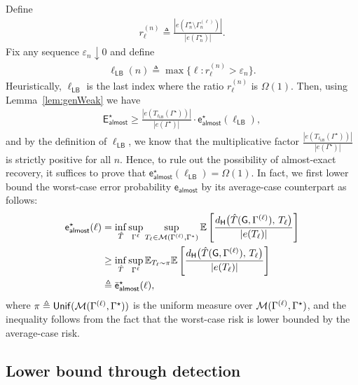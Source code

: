 \documentclass[12pt]{article}
\newcommand{\bE}{\mathbb{E}}
\newcommand{\calM}{{\cal M}}
\newcommand{\s}[1]{\mathsf{#1}}
\begin{document}
Define
\begin{align}
r_\ell^{(n)}\triangleq\frac{|e(\Gamma_n^\star\setminus \Gamma_n^{(\ell)})|}{|e(\Gamma^\star_n)|}.
\end{align}
Fix any sequence $\varepsilon_n\downarrow 0$ and define
\begin{align}
\ell_{\s{LB}}(n)\triangleq\max\{\ell: r_\ell^{(n)}>\varepsilon_n\}.
\end{align}
Heuristically, $\ell_{\s{LB}}$ is the last index where the ratio $r_\ell^{(n)}$ is $\Omega(1)$. Then, using Lemma~\ref{lem:genWeak} we have
\begin{align}
    \s{E}^\star_{\s{almost}}\geq \frac{|e(T_{\ell_{\s{LB}}}(\Gamma^\star))|}{|e(\Gamma^\star)|}\cdot\s{e}_{\s{almost}}^\star(\ell_{\s{LB}}),
\end{align}
and by the definition of $\ell_{\s{LB}}$, we know that the multiplicative factor $\frac{|e(T_{\ell_{\s{LB}}}(\Gamma^\star))|}{|e(\Gamma^\star)|}$ is strictly positive for all $n$. Hence, to rule out the possibility of almost-exact recovery, it suffices to prove that $\s{e}_{\s{almost}}^\star(\ell_{\s{LB}}) = \Omega(1)$. In fact, we first lower bound the worst-case error probability $\s{e}_{\s{almost}}$ by its average-case counterpart as follows:
\begin{align}
\s{e}_{\s{almost}}^\star(\ell)&= \inf_{\hat T}\sup_{\Gamma^{\ell}}\sup_{T_\ell\in\calM(\Gamma^{(\ell)},\Gamma^\star)}
\mathbb E\left[\frac{d_{\s{H}}\big(\hat T(\s{G},\Gamma^{(\ell)}),\,T_\ell\big)}{|e(T_\ell)|}\right]\\
&\geq \inf_{\hat T}\sup_{\Gamma^{\ell}}\bE_{T_\ell\sim\pi}
\mathbb E\left[\frac{d_{\s{H}}\big(\hat T(\s{G},\Gamma^{(\ell)}),\,T_\ell\big)}{|e(T_\ell)|}\right]\\
&\triangleq\bar{\s{e}}_{\s{almost}}^\star(\ell),\label{eqn:lossGenParAvg}
\end{align}
where $\pi \triangleq \s{Unif}(\calM(\Gamma^{(\ell)},\Gamma^\star))$ is the uniform measure over $\calM(\Gamma^{(\ell)},\Gamma^\star)$, and the inequality follows from the fact that the worst-case risk is lower bounded by the average-case risk.

\subsection{Lower bound through detection}
\end{document}
